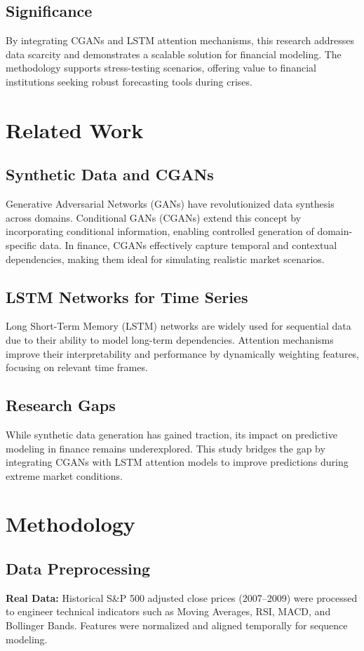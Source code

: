 \documentclass[conference]{IEEEtran}
\begin{document}
\subsection{Significance}
By integrating CGANs and LSTM attention mechanisms, this research addresses data scarcity and demonstrates a scalable solution for financial modeling. The methodology supports stress-testing scenarios, offering value to financial institutions seeking robust forecasting tools during crises.

\section{Related Work}
\subsection{Synthetic Data and CGANs}
Generative Adversarial Networks (GANs) have revolutionized data synthesis across domains. Conditional GANs (CGANs) extend this concept by incorporating conditional information, enabling controlled generation of domain-specific data. In finance, CGANs effectively capture temporal and contextual dependencies, making them ideal for simulating realistic market scenarios.

\subsection{LSTM Networks for Time Series}
Long Short-Term Memory (LSTM) networks are widely used for sequential data due to their ability to model long-term dependencies. Attention mechanisms improve their interpretability and performance by dynamically weighting features, focusing on relevant time frames.

\subsection{Research Gaps}
While synthetic data generation has gained traction, its impact on predictive modeling in finance remains underexplored. This study bridges the gap by integrating CGANs with LSTM attention models to improve predictions during extreme market conditions.

\section{Methodology}
\subsection{Data Preprocessing}
\textbf{Real Data:} Historical S&P 500 adjusted close prices (2007--2009) were processed to engineer technical indicators such as Moving Averages, RSI, MACD, and Bollinger Bands. Features were normalized and aligned temporally for sequence modeling.
\end{document}

